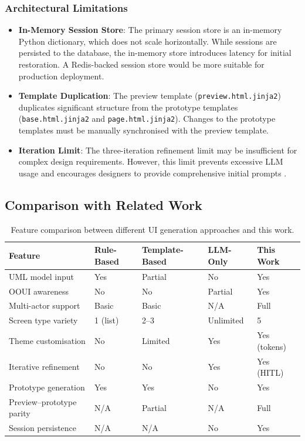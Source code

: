 \subsubsection{Architectural Limitations}
\begin{itemize}
    \item \textbf{In-Memory Session Store}: The primary session store is an in-memory Python dictionary, which does not scale horizontally. While sessions are persisted to the database, the in-memory store introduces latency for initial restoration. A Redis-backed session store would be more suitable for production deployment.
    \item \textbf{Template Duplication}: The preview template (\texttt{preview.html.jinja2}) duplicates significant structure from the prototype templates (\texttt{base.html.jinja2} and \texttt{page.html.jinja2}). Changes to the prototype templates must be manually synchronised with the preview template.
    \item \textbf{Iteration Limit}: The three-iteration refinement limit may be insufficient for complex design requirements. However, this limit prevents excessive LLM usage and encourages designers to provide comprehensive initial prompts \cite{dH24}.
\end{itemize}


\subsection{Comparison with Related Work}

\begin{table}[H]
\centering
\small
\begin{tabular}{p{3.5cm}p{2.5cm}p{2.5cm}p{2.5cm}p{2.5cm}}
\hline
\textbf{Feature} & \textbf{Rule-Based \newline \cite{vD24}} & \textbf{Template-Based} & \textbf{LLM-Only \newline \cite{Zei23}} & \textbf{This Work} \\
\hline
UML model input & Yes & Partial & No & Yes \\
OOUI awareness & No & No & Partial & Yes \\
Multi-actor support & Basic & Basic & N/A & Full \\
Screen type variety & 1 (list) & 2--3 & Unlimited & 5 \\
Theme customisation & No & Limited & Yes & Yes (tokens) \\
Iterative refinement & No & No & Yes & Yes (HITL) \\
Prototype generation & Yes & Yes & No & Yes \\
Preview--prototype parity & N/A & Partial & N/A & Full \\
Session persistence & N/A & N/A & No & Yes \\
\hline
\end{tabular}
\caption{Feature comparison between different UI generation approaches and this work.}
\label{tab:comparison}
\end{table}

